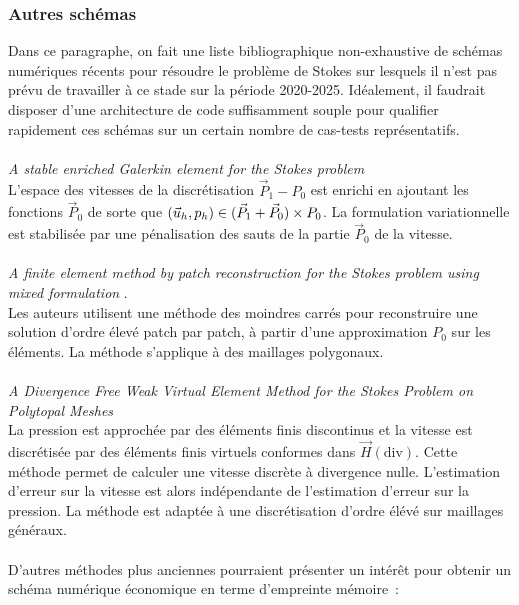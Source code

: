 \subsubsection{Autres sch\'emas}
Dans ce paragraphe, on fait une liste bibliographique non-exhaustive de sch\'emas num\'eriques r\'ecents pour r\'esoudre le probl\`eme de Stokes sur lesquels il n'est pas pr\'evu de travailler  \`a ce stade sur la p\'eriode 2020-2025. Id\'ealement, il faudrait disposer d'une architecture de code suffisamment souple pour qualifier rapidement ces sch\'emas sur un certain nombre de cas-tests repr\'esentatifs.\\
\\
{\em A stable enriched Galerkin element for the Stokes problem} \cite{CGRT18}
\\
L'espace des vitesses de la discr\'etisation $\vec{P}_1-P_0$ est enrichi en ajoutant les fonctions $\vec{P}_0$ de sorte que $(\velocity_h,p_h)\in(\vec{P}_1+\vec{P}_0)\times P_0$. La formulation variationnelle est stabilis\'ee par une p\'enalisation des sauts de la partie $\vec{P}_0$ de la vitesse.\\
\\
{\em A finite element method by patch reconstruction for the Stokes problem using mixed formulation} \cite{LSYY19}.
\\
Les auteurs utilisent une m\'ethode des moindres carr\'es pour reconstruire une solution d'ordre \'elev\'e patch par patch, \`a partir d'une approximation $P_0$ sur les \'el\'ements. La m\'ethode s'applique \`a des maillages polygonaux.\\
\\
{\em A Divergence Free Weak Virtual Element Method for the
Stokes Problem on Polytopal Meshes} \cite{ChWa19}
\\
La pression est approch\'ee par des \'el\'ements finis discontinus et la vitesse est discr\'etis\'ee par des \'el\'ements finis virtuels conformes dans $\vec{H}(\mathrm{div})$. Cette m\'ethode permet de calculer une vitesse discr\`ete \`a divergence nulle. L'estimation d'erreur sur la vitesse est alors ind\'ependante de l'estimation d'erreur sur la pression. La m\'ethode est adapt\'ee \`a une discr\'etisation d'ordre \'el\'ev\'e sur maillages g\'en\'eraux.\\
\\
D'autres m\'ethodes plus anciennes pourraient pr\'esenter un int\'er\^et pour obtenir un sch\'ema num\'erique \'economique en terme d'empreinte m\'emoire~:
\\
\\
